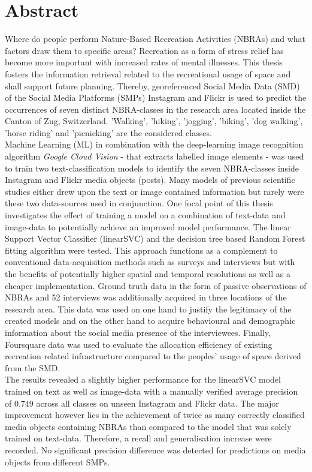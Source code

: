 \chapter*{Abstract}
Where do people perform Nature-Based Recreation Activities (NBRAs) and what factors draw them to specific areas? Recreation as a form of stress relief has become more important with increased rates of mental illnesses. This thesis fosters the information retrieval related to the recreational usage of space and shall support future planning. Thereby, georeferenced Social Media Data (SMD) of the Social Media Platforms (SMPs) Instagram and Flickr is used to predict the occurrences of seven distinct NBRA-classes in the research area located inside the Canton of Zug, Switzerland. 'Walking', 'hiking', 'jogging', 'biking', 'dog walking', 'horse riding' and 'picnicking' are the considered classes. \\
Machine Learning (ML) in combination with the deep-learning image recognition algorithm \textit{Google Cloud Vision} - that extracts labelled image elements - was used to train two text-classification models to identify the seven NBRA-classes inside Instagram and Flickr media objects (posts). Many models of previous scientific studies either drew upon the text or image contained information but rarely were these two data-sources used in conjunction. One focal point of this thesis investigates the effect of training a model on a combination of text-data and image-data to potentially achieve an improved model performance. The linear Support Vector Classifier (linearSVC) and the decision tree based Random Forest fitting algorithm were tested. This approach functions as a complement to conventional data-acquisition methods such as surveys and interviews but with the benefits of potentially higher spatial and temporal resolutions as well as a cheaper implementation. Ground truth data in the form of passive observations of NBRAs and 52 interviews was additionally acquired in three locations of the research area. This data was used on one hand to justify the legitimacy of the created models and on the other hand to acquire behavioural and demographic information about the social media presence of the interviewees. Finally, Foursquare data was used to evaluate the allocation efficiency of existing recreation related infrastructure compared to the peoples' usage of space derived from the SMD.\\
The results revealed a slightly higher performance for the linearSVC model trained on text as well as image-data with a manually verified average precision of 0.749 across all classes on unseen Instagram and Flickr data. The major improvement however lies in the achievement of twice as many correctly classified media objects containing NBRAs than compared to the model that was solely trained on text-data. Therefore, a recall and generalisation increase were recorded. No significant precision difference was detected for predictions on media objects from different SMPs.
